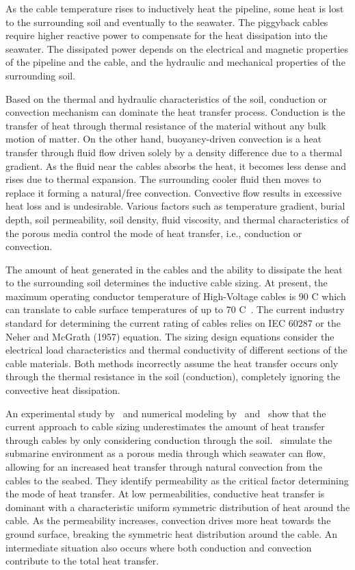 \documentclass[Journal,letterpaper,InsideFigs]{ascelike-new}
\begin{document}
As the cable temperature rises to inductively heat the pipeline, some heat is lost to the surrounding soil and eventually to the seawater. The piggyback cables require higher reactive power to compensate for the heat dissipation into the seawater. The dissipated power depends on the electrical and magnetic properties of the pipeline and the cable, and the hydraulic and mechanical properties of the surrounding soil.

Based on the thermal and hydraulic characteristics of the soil, conduction or convection mechanism can dominate the heat transfer process. Conduction is the transfer of heat through thermal resistance of the material without any bulk motion of matter. On the other hand, buoyancy-driven convection is a heat transfer through fluid flow driven solely by a density difference due to a thermal gradient. As the fluid near the cables absorbs the heat, it becomes less dense and rises due to thermal expansion. The surrounding cooler fluid then moves to replace it forming a natural/free convection. Convective flow results in excessive heat loss and is undesirable. Various factors such as temperature gradient, burial depth, soil permeability, soil density, fluid viscosity, and thermal characteristics of the porous media control the mode of heat transfer, i.e., conduction or convection. 

The amount of heat generated in the cables and the ability to dissipate the heat to the surrounding soil determines the inductive cable sizing. At present, the maximum operating conductor temperature of High-Voltage cables is 90 C which can translate to cable surface temperatures of up to 70 C~\cite{hughes2015effect,swaffield2008methods}. The current industry standard for determining the current rating of cables relies on IEC 60287 or the Neher and McGrath (1957) equation. The sizing design equations consider the electrical load characteristics and thermal conductivity of different sections of the cable materials. Both methods incorrectly assume the heat transfer occurs only through the thermal resistance in the soil (conduction), completely ignoring the convective heat dissipation.

An experimental study by~ and numerical modeling by~ and~ show that the current approach to cable sizing underestimates the amount of heat transfer through cables by only considering conduction through the soil.~ simulate the submarine environment as a porous media through which seawater can flow, allowing for an increased heat transfer through natural convection from the cables to the seabed. They identify permeability as the critical factor determining the mode of heat transfer. At low permeabilities, conductive heat transfer is dominant with a characteristic uniform symmetric distribution of heat around the cable. As the permeability increases, convection drives more heat towards the ground surface, breaking the symmetric heat distribution around the cable. An intermediate situation also occurs where both conduction and convection contribute to the total heat transfer. 
\end{document}
